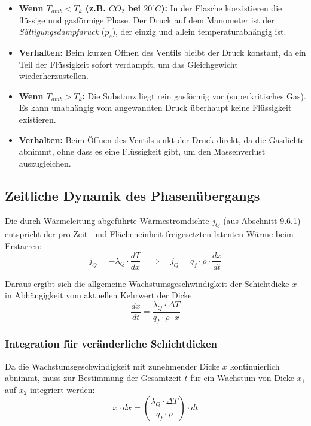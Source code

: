 \begin{itemize}
    \item \textbf{Wenn $T_{amb} < T_k$ (z.B. $CO_2$ bei $20^\circ C$):} 
    In der Flasche koexistieren die flüssige und gasförmige Phase. Der Druck auf dem Manometer ist der \textit{Sättigungsdampfdruck} ($p_s$), der einzig und allein temperaturabhängig ist.
    \item \textbf{Verhalten:} Beim kurzen Öffnen des Ventils bleibt der Druck konstant, da ein Teil der Flüssigkeit sofort verdampft, um das Gleichgewicht wiederherzustellen.
    \medskip
    \item \textbf{Wenn $T_{amb} > T_k$:} 
    Die Substanz liegt rein gasförmig vor (superkritisches Gas). Es kann unabhängig vom angewandten Druck überhaupt keine Flüssigkeit existieren.
    \item \textbf{Verhalten:} Beim Öffnen des Ventils sinkt der Druck direkt, da die Gasdichte abnimmt, ohne dass es eine Flüssigkeit gibt, um den Massenverlust auszugleichen.
\end{itemize}\smallbreak

\subsection{Zeitliche Dynamik des Phasenübergangs }
Die durch Wärmeleitung abgeführte Wärmestromdichte $j_Q$ (aus Abschnitt 9.6.1) entspricht der pro Zeit- und Flächeneinheit freigesetzten latenten Wärme beim Erstarren:
\begin{equation*}
j_Q = -\lambda_Q \cdot \frac{dT}{dx} \quad \Longrightarrow \quad j_Q = q_f \cdot \rho \cdot \frac{dx}{dt}
\end{equation*}

Daraus ergibt sich die allgemeine Wachstumsgeschwindigkeit der Schichtdicke $x$ in Abhängigkeit vom aktuellen Kehrwert der Dicke:
\begin{equation*}
\frac{dx}{dt} = \frac{\lambda_Q \cdot \Delta T}{q_f \cdot \rho \cdot x}
\end{equation*}

\subsubsection{Integration für veränderliche Schichtdicken}
Da die Wachstumsgeschwindigkeit mit zunehmender Dicke $x$ kontinuierlich abnimmt, muss zur Bestimmung der Gesamtzeit $t$ für ein Wachstum von Dicke $x_1$ auf $x_2$ integriert werden:
\begin{equation*}
x \cdot dx = \left( \frac{\lambda_Q \cdot \Delta T}{q_f \cdot \rho} \right) \cdot dt
\end{equation*}

